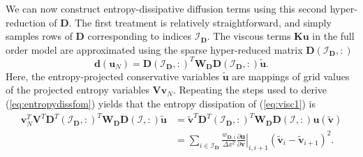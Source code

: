 \documentclass[preprint,10pt]{elsarticle}
\theoremstyle{definition}
\theoremstyle{lemma}
\theoremstyle{theorem}
\theoremstyle{assumption}
\renewcommand{\tilde}{\widetilde}
\newcommand{\pd}[2]{\frac{\partial#1}{\partial#2}}
\newcommand{\LRp}[1]{\left( #1 \right)}
\newcommand{\LRl}[1]{\left. #1 \right|}
\begin{document}
We can now construct entropy-dissipative diffusion terms using this second hyper-reduction of $\bm{D}$.  The first treatment is relatively straightforward, and simply samples rows of $\bm{D}$ corresponding to indices $\mathcal{I}_{\bm{D}}$.  The viscous terms $\bm{K}\bm{u}$ in the full order model are approximated using the sparse hyper-reduced matrix $\bm{D}\LRp{\mathcal{I}_{\bm{D}},:}$
\begin{equation}
\bm{d}(\bm{u}_N) = \bm{D}\LRp{\mathcal{I}_{\bm{D}},:}^T \bm{W}_{\bm{D}} \bm{D}\LRp{\mathcal{I}_{\bm{D}},:}\tilde{\bm{u}}.
\label{eq:visc1}
\end{equation}
Here, the entropy-projected conservative variables $\tilde{\bm{u}}$ are mappings of grid values of the projected entropy variables  $\bm{V}\bm{v}_N$.  Repeating the steps used to derive (\ref{eq:entropydissfom}) yields that the entropy dissipation of (\ref{eq:visc1}) is 
\begin{align*}
\bm{v}_N^T\bm{V}^T\bm{D}^T\LRp{\mathcal{I}_{\bm{D}},:}^T \bm{W}_{\bm{D}} \bm{D}\LRp{\mathcal{I},:}\tilde{\bm{u}} &= 
\tilde{\bm{v}}^T\bm{D}^T\LRp{\mathcal{I}_{\bm{D}},:}^T \bm{W}_{\bm{D}} \bm{D}\LRp{\mathcal{I},:}\bm{u}\LRp{\tilde{\bm{v}}}
\\
&= \sum_{i\in \mathcal{I}_{\bm{D}}} \frac{w_{\bm{D},i}}{\Delta x^2} \LRl{\pd{\bm{u}}{\bm{v}}}_{i,i+1} \LRp{\tilde{\bm{v}}_i - \tilde{\bm{v}}_{i+1}}^2.
\end{align*}
\end{document}
